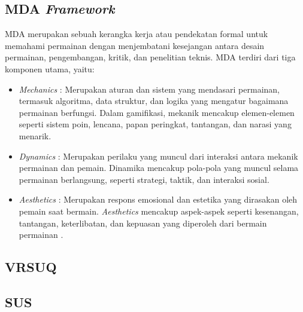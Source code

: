 \subsection{MDA \textit{Framework}}
MDA merupakan sebuah kerangka kerja atau pendekatan formal untuk memahami permainan dengan menjembatani kesejangan antara desain permainan, pengembangan, kritik, dan penelitian teknis.
MDA terdiri dari tiga komponen utama, yaitu:
\begin{itemize}
	\item \textit{Mechanics} : Merupakan aturan dan sistem yang mendasari permainan, termasuk algoritma, data struktur, dan logika yang mengatur bagaimana permainan berfungsi. Dalam gamifikasi, mekanik mencakup elemen-elemen seperti sistem poin, lencana, papan peringkat, tantangan, dan narasi yang menarik.
	\item \textit{Dynamics} : Merupakan perilaku yang muncul dari interaksi antara mekanik permainan dan pemain. Dinamika mencakup pola-pola yang muncul selama permainan berlangsung, seperti strategi, taktik, dan interaksi sosial.
	\item \textit{Aesthetics} : Merupakan respons emosional dan estetika yang dirasakan oleh pemain saat bermain. \textit{Aesthetics} mencakup aspek-aspek seperti kesenangan, tantangan, keterlibatan, dan kepuasan yang diperoleh dari bermain permainan \cite{Hunicke_LeBlanc_Zubek_2004}.
	
\end{itemize}
\subsection{VRSUQ}

\subsection{SUS}

\




